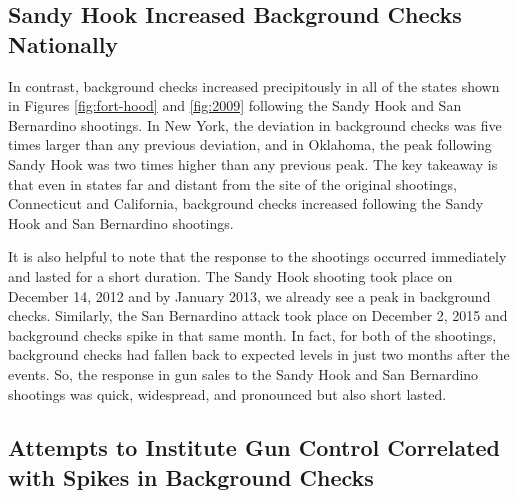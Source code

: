 \documentclass[9pt,twocolumn,twoside,lineno]{pnas-new}
\begin{document}
\subsection*{Sandy Hook Increased Background Checks Nationally}

In contrast, background checks increased precipitously in all of the states shown in Figures \ref{fig:fort-hood} and \ref{fig:2009} following the Sandy Hook and San Bernardino shootings. In New York, the deviation in background checks was five times larger than any previous deviation, and in Oklahoma, the peak following Sandy Hook was two times higher than any previous peak. The key takeaway is that even in states far and distant from the site of the original shootings, Connecticut and California, background checks increased following the Sandy Hook and San Bernardino shootings. 

It is also helpful to note that the response to the shootings occurred immediately and lasted for a short duration. The Sandy Hook shooting took place on December 14, 2012 and by January 2013, we already see a peak in background checks. Similarly, the San Bernardino attack took place on December 2, 2015 and background checks spike in that same month. In fact, for both of the shootings, background checks had fallen back to expected levels in just two months after the events. So, the response in gun sales to the Sandy Hook and San Bernardino shootings was quick, widespread, and pronounced but also short lasted. 
\subsection*{Attempts to Institute Gun Control Correlated with Spikes in Background Checks}
\end{document}
